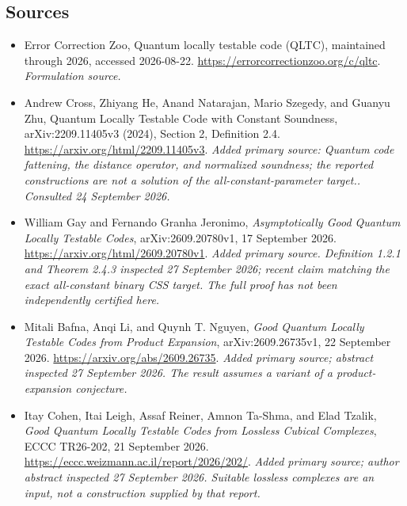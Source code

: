 \documentclass[11pt]{article}
\begin{document}
\subsection{Sources}
\begin{itemize}
\item[S1]Error Correction Zoo, Quantum locally testable code (QLTC), maintained through 2026, accessed 2026-08-22.
\url{https://errorcorrectionzoo.org/c/qltc}.
\textit{Formulation source.}
\item[E1]Andrew Cross, Zhiyang He, Anand Natarajan, Mario Szegedy, and Guanyu Zhu, Quantum Locally Testable Code with Constant Soundness, arXiv:2209.11405v3 (2024), Section 2, Definition 2.4.
\url{https://arxiv.org/html/2209.11405v3}.
\textit{Added primary source: Quantum code fattening, the distance operator, and normalized soundness; the reported constructions are not a solution of the all-constant-parameter target.. Consulted 24 September 2026.}
\item[E2]William Gay and Fernando Granha Jeronimo, \emph{Asymptotically Good Quantum Locally Testable Codes}, arXiv:2609.20780v1, 17 September 2026.
\url{https://arxiv.org/html/2609.20780v1}.
\textit{Added primary source. Definition 1.2.1 and Theorem 2.4.3 inspected 27 September 2026; recent claim matching the exact all-constant binary CSS target. The full proof has not been independently certified here.}
\item[E3]Mitali Bafna, Anqi Li, and Quynh T. Nguyen, \emph{Good Quantum Locally Testable Codes from Product Expansion}, arXiv:2609.26735v1, 22 September 2026.
\url{https://arxiv.org/abs/2609.26735}.
\textit{Added primary source; abstract inspected 27 September 2026. The result assumes a variant of a product-expansion conjecture.}
\item[E4]Itay Cohen, Itai Leigh, Assaf Reiner, Amnon Ta-Shma, and Elad Tzalik, \emph{Good Quantum Locally Testable Codes from Lossless Cubical Complexes}, ECCC TR26-202, 21 September 2026.
\url{https://eccc.weizmann.ac.il/report/2026/202/}.
\textit{Added primary source; author abstract inspected 27 September 2026. Suitable lossless complexes are an input, not a construction supplied by that report.}
\end{itemize}
\end{document}
